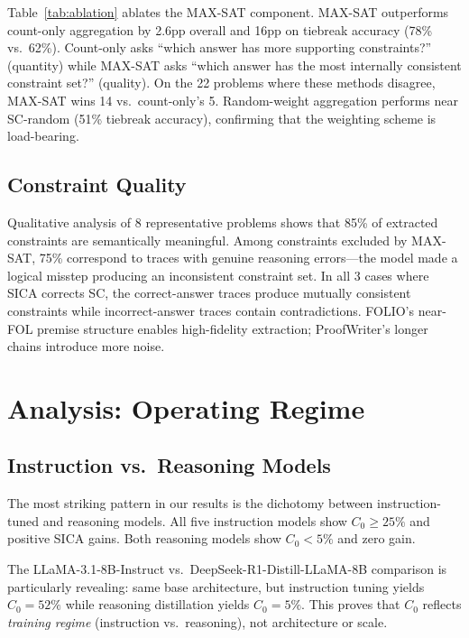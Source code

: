 \documentclass[11pt,a4paper]{article}
\begin{document}
Table~\ref{tab:ablation} ablates the MAX-SAT component. MAX-SAT outperforms count-only aggregation by 2.6pp overall and 16pp on tiebreak accuracy (78\% vs.\ 62\%). Count-only asks ``which answer has more supporting constraints?'' (quantity) while MAX-SAT asks ``which answer has the most internally consistent constraint set?'' (quality). On the 22 problems where these methods disagree, MAX-SAT wins 14 vs.\ count-only's 5. Random-weight aggregation performs near SC-random (51\% tiebreak accuracy), confirming that the weighting scheme is load-bearing.

\subsection{Constraint Quality}
\label{sec:constraint_quality}

Qualitative analysis of 8 representative problems shows that 85\% of extracted constraints are semantically meaningful. Among constraints excluded by MAX-SAT, 75\% correspond to traces with genuine reasoning errors---the model made a logical misstep producing an inconsistent constraint set. In all 3 cases where SICA corrects SC, the correct-answer traces produce mutually consistent constraints while incorrect-answer traces contain contradictions. FOLIO's near-FOL premise structure enables high-fidelity extraction; ProofWriter's longer chains introduce more noise.

\section{Analysis: Operating Regime}
\label{sec:analysis}

\subsection{Instruction vs.\ Reasoning Models}

The most striking pattern in our results is the dichotomy between instruction-tuned and reasoning models. All five instruction models show $C_0 \geq 25\%$ and positive SICA gains. Both reasoning models show $C_0 < 5\%$ and zero gain.

The LLaMA-3.1-8B-Instruct vs.\ DeepSeek-R1-Distill-LLaMA-8B comparison is particularly revealing: same base architecture, but instruction tuning yields $C_0=52\%$ while reasoning distillation yields $C_0=5\%$. This proves that $C_0$ reflects \emph{training regime} (instruction vs.\ reasoning), not architecture or scale.
\end{document}
